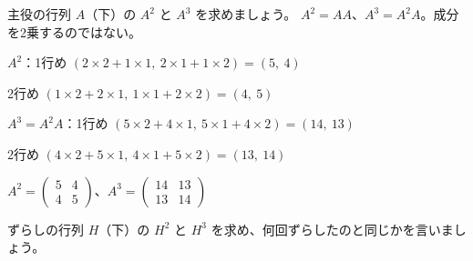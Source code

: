 \begin{reidai}[同じ行列を何回もかける]
主役の行列 $A$（下）の $A^2$ と $A^3$ を求めましょう。
\kangaekata $A^2=AA$、$A^3=A^2A$。成分を2乗するのではない。\par
\shiki\kviids{}\zw{} $A^2$：1行め $(2\times2+1\times1,\ 2\times1+1\times2)=(5,\ 4)$\par
\kviidb 2行め $(1\times2+2\times1,\ 1\times1+2\times2)=(4,\ 5)$\par
\kviida $A^3=A^2A$：1行め $(5\times2+4\times1,\ 5\times1+4\times2)=(14,\ 13)$\par
\kviidb 2行め $(4\times2+5\times1,\ 4\times1+5\times2)=(13,\ 14)$\par
\kotae\kviids{}\zw{} $A^2=\begin{pmatrix}5&4\\4&5\end{pmatrix}$、$A^3=\begin{pmatrix}14&13\\13&14\end{pmatrix}$
\end{reidai}

\begin{jibun}
ずらしの行列 $H$（下）の $H^2$ と $H^3$ を求め、何回ずらしたのと同じかを言いましょう。
\end{jibun}

